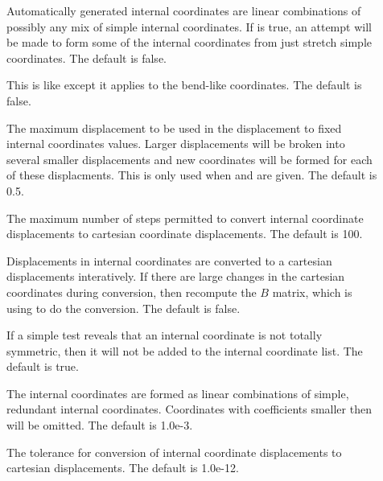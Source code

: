 \begin{description}
  \item[] Automatically generated internal
    coordinates are linear combinations of possibly any mix of simple
    internal coordinates.  If  is true, an attempt
    will be made to form some of the internal coordinates from just stretch
    simple coordinates.  The default is false.

  \item[] This is like 
    except it applies to the bend-like coordinates.  The default is false.

  \item[] The maximum displacement to be used in
    the displacement to fixed internal coordinates values.  Larger
    displacements will be broken into several smaller displacements and new
    coordinates will be formed for each of these displacments. This is only
    used when  and  are given.  The
    default is 0.5.

  \item[] The maximum number of steps permitted
    to convert internal coordinate displacements to cartesian coordinate
    displacements.  The default is 100.
               
  \item[] Displacements in internal coordinates are
     converted to a cartesian displacements interatively.  If there are
     large changes in the cartesian coordinates during conversion, then
     recompute the $B$ matrix, which is using to do the conversion.  The
     default is false.

  \item[] If a simple test reveals that an
     internal coordinate is not totally symmetric, then it will not be
     added to the internal coordinate list.  The default is true.
               
  \item[] The internal coordinates are formed as
     linear combinations of simple, redundant internal coordinates.
     Coordinates with coefficients smaller then 
     will be omitted. The default is 1.0e-3.

  \item[] The tolerance for conversion of
     internal coordinate displacements to cartesian displacements.  The
     default is 1.0e-12.
               

\end{description}
